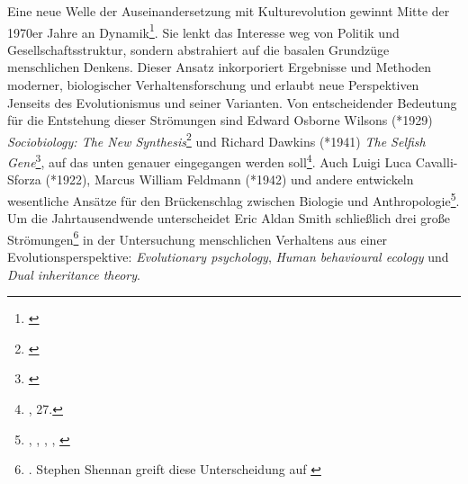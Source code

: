 \documentclass[openany,twoside,twocolumn]{book}
\let\rmarkdownfootnote\footnote%
\def\footnote{\protect\rmarkdownfootnote}
\begin{document}
Eine neue Welle der Auseinandersetzung mit Kulturevolution gewinnt Mitte
der 1970er Jahre an Dynamik\footnote{\textcite{creanza_cultural_2017}}.
Sie lenkt das Interesse weg von Politik und Gesellschaftsstruktur,
sondern abstrahiert auf die basalen Grundzüge menschlichen Denkens.
Dieser Ansatz inkorporiert Ergebnisse und Methoden moderner,
biologischer Verhaltensforschung und erlaubt neue Perspektiven Jenseits
des Evolutionismus und seiner Varianten. Von entscheidender Bedeutung
für die Entstehung dieser Strömungen sind Edward Osborne Wilsons (*1929)
\emph{Sociobiology: The New Synthesis}\footnote{\textcite{WilsonSociobiologynewsynthesis1975}}
und Richard Dawkins (*1941) \emph{The Selfish Gene}\footnote{\textcite{Dawkinsselfishgene1976}},
auf das unten genauer eingegangen werden soll\footnote{\textcite{SmithThreestylesevolutionary2000},
  27.}. Auch Luigi Luca Cavalli-Sforza (*1922), Marcus William Feldmann
(*1942) und andere entwickeln wesentliche Ansätze für den Brückenschlag
zwischen Biologie und Anthropologie\footnote{\textcite{alland_cultural_1972},
  \textcite{cavalli-sforza_models_1973}, \textcite{feldman_models_1975},
  \textcite{feldman_cultural_1976}, \textcite{blum_uncertainty_1978}}.
Um die Jahrtausendwende unterscheidet Eric Aldan Smith schließlich drei
große Strömungen\footnote{\textcite{SmithThreestylesevolutionary2000}.
  Stephen Shennan greift diese Unterscheidung auf
  \autocite[15-18.]{ShennanGenesmemeshuman2002}} in der Untersuchung
menschlichen Verhaltens aus einer Evolutionsperspektive:
\emph{Evolutionary psychology}, \emph{Human behavioural ecology} und
\emph{Dual inheritance theory}.
\end{document}
